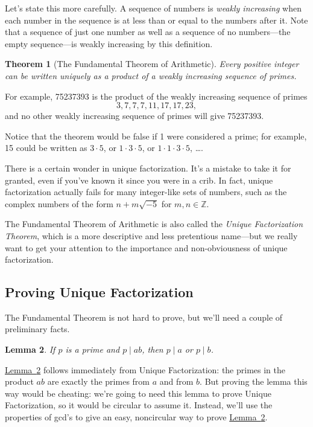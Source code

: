 \documentclass[11pt,oneside]{book}
\newtheorem{thm}{Theorem}[section]
\newtheorem{lem}[thm]{Lemma}
\theoremstyle{definition}
\begin{document}
Let's state this more carefully.
A sequence of numbers is \emph{weakly increasing} when each number in the sequence is at less than or equal to the numbers after it.
Note that a sequence of just one number as well as a sequence of no numbers---the empty sequence---is weakly increasing by this definition.
\begin{thm}[The Fundamental Theorem of Arithmetic]
    Every positive integer can be written uniquely as a product of a weakly increasing sequence of primes.
\end{thm}

For example, 75237393 is the product of the weakly increasing sequence of
primes
\[ 3, 7, 7, 7, 11, 17, 17, 23, \]
and no other weakly increasing sequence of primes will give 75237393.

Notice that the theorem would be false if 1 were considered a prime; for example, 15 could be written as $3 \cdot 5$, or $1 \cdot 3 \cdot 5$, or $1 \cdot 1 \cdot 3 \cdot 5$, \dots.

There is a certain wonder in unique factorization.
It's a mistake to take it for granted, even if you've known it since you were in a crib.
In fact, unique factorization actually fails for many integer-like sets of numbers, such as the complex numbers of the form $n + m\sqrt{-5}$ for $m, n \in \mathbb{Z}$.

The Fundamental Theorem of Arithmetic is also called the \emph{Unique Factorization Theorem}, which is a more descriptive and less pretentious name---but we really want to get your attention to the importance and non-obviousness of unique factorization.


\subsection{Proving Unique Factorization}
The Fundamental Theorem is not hard to prove, but we'll need a couple of preliminary facts.

\begin{lem} \label{lem:PrimeDivides}
    If $p$ is a prime and $p \mid ab$, then $p \mid a$ or $p \mid b$.
\end{lem}

\hyperref[lem:PrimeDivides]{Lemma~\ref*{lem:PrimeDivides}} follows immediately from Unique Factorization: the primes in the product $ab$ are exactly the primes from $a$ and from $b$.
But proving the lemma this way would be cheating: we're going to need this lemma to prove Unique Factorization, so it would be circular to assume it.
Instead, we'll use the properties of gcd's to give an easy, noncircular way to prove \hyperref[lem:PrimeDivides]{Lemma~\ref*{lem:PrimeDivides}}.
\end{document}
